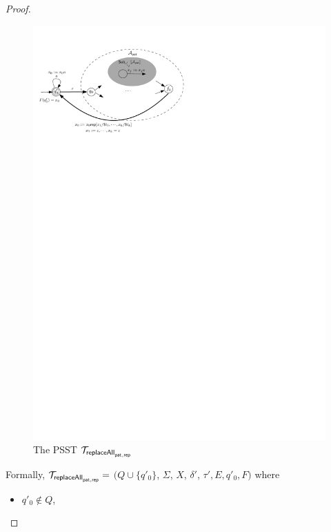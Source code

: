 \begin{proof}
	\begin{figure}[ht]
		\centering
		\includegraphics[scale=0.9]{psst-replaceall.pdf}
		\caption{The PSST $\mathcal{T}_{\mathsf{replaceAll}_{\mathsf{pat},\mathsf{rep}}}$}
		\label{fig-psst-replaceall}
	\end{figure}
	
	Formally, $\mathcal{T}_{\mathsf{replaceAll}_{\mathsf{pat}, \mathsf{rep}}} =$ $(Q \cup \{q'_0\}$, $\Sigma$, $X$, $\delta'$, $\tau', E, q'_0, F)$ where
	\begin{itemize}
		\item $q'_0 \not \in Q$,
		

\end{itemize}
\end{proof}
